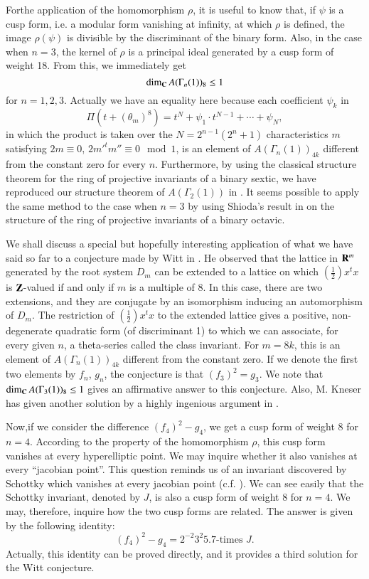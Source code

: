 For\pageoriginale the application of the homomorphism $\rho$, it is useful to know that, if $\psi$ is a cusp form, i.e. a modular form vanishing at infinity, at which $\rho$ is defined, the image $\rho(\psi)$ is divisible by the discriminant of the binary form. Also, in the case when $n=3$, the kernel of $\rho$ is a principal ideal generated by a cusp form of weight 18. From this, we immediately get
$$
\dim_{\mathbf{C}}A(\Gamma_{n}(1))_{8}\leq 1
$$
for $n=1,2,3$. Actually we have an equality here because each coefficient $\psi_{k}$ in
$$
\Pi (t+(\theta_{m})^{8})=t^{N}+\psi_{1}\cdot t^{N-1}+\cdots+\psi_{N},
$$
in which the product is taken over the $N=2^{n-1}(2^{n}+1)$ characteristics $m$ satisfying $2m\equiv 0$, $2{m'}^{t}m''\equiv 0\mod 1$, is an element of $A(\Gamma_{n}(1))_{4k}$ different from the constant zero for every $n$. Furthermore, by using the classical structure theorem for the ring of projective invariants of a binary sextic, we have reproduced our structure theorem of $A(\Gamma_{2}(1))$ in \cite{art12-key12}. It seems possible to apply the same method to the case when $n=3$ by using Shioda's result in \cite{art12-key21} on the structure of the ring of projective invariants of a binary octavic.

We shall discuss a special but hopefully interesting application of what we have said so far to a conjecture made by Witt in \cite{art12-key27}. He observed that the lattice in $\mathbf{R}^{m}$ generated by the root system $D_{m}$ can be extended to a lattice on which $(\frac{1}{2})x^{t}x$ is $\mathbf{Z}$-valued if and only if $m$ is a multiple of 8. In this case, there are two extensions, and they are conjugate by an isomorphism inducing an automorphism of $D_{m}$. The restriction of $(\frac{1}{2})x^{t}x$ to the extended lattice gives a positive, non-degenerate quadratic form (of discriminant 1) to which we can associate, for every given $n$, a theta-series called the class invariant. For $m=8k$, this is an element of $A(\Gamma_{n}(1))_{4k}$ different from the constant zero. If we denote the first two elements by $f_{n}$, $g_{n}$, the conjecture is that $(f_{3})^{2}=g_{3}$. We note that $\dim_{\mathbf{C}}A(\Gamma_{3}(1))_{8}\leq 1$ gives an affirmative answer to this conjecture. Also, M. Kneser has given another solution by a highly ingenious argument in \cite{art12-key14}.

Now,\pageoriginale if we consider the difference $(f_{4})^{2}-g_{4}$, we get a cusp form of weight 8 for $n=4$. According to the property of the homomorphism $\rho$, this cusp form vanishes at every hyperelliptic point. We may inquire whether it also vanishes at every ``jacobian point''. This question reminds us of an invariant discovered by Schottky which vanishes at every jacobian point (c.f. \cite{art12-key19}). We can see easily that the Schottky invariant, denoted by $J$, is also a cusp form of weight $8$ for $n=4$. We may, therefore, inquire how the two cusp forms are related. The answer is given by the following identity:
$$
(f_{4})^{2}-g_{4}=2^{-2}3^{2}5.7\text{-times } J.
$$
Actually, this identity can be proved directly, and it provides a third solution for the Witt conjecture.


